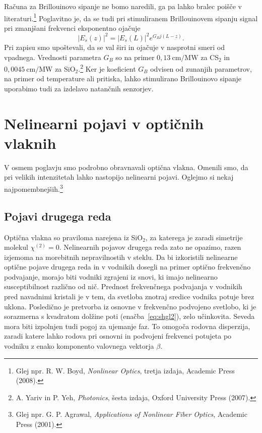 Računa za Brillouinovo sipanje ne bomo naredili, ga pa lahko bralec poišče
v literaturi.\footnote{Glej npr. R. W. Boyd, {\it Nonlinear Optics}, tretja izdaja, Academic Press (2008).}
Poglavitno 
je, da se tudi pri stimuliranem Brillouinovem sipanju signal pri zmanjšani frekvenci
eksponentno ojačuje
\begin{equation}
|E_s(z)|^2 = |E_s(L)|^2 e^{G_Bj(L-z)}.
\end{equation}
Pri zapisu smo upoštevali, da se val širi in ojačuje v nasprotni smeri od vpadnega.
Vrednosti parametra $G_B$ so na primer $0,13~\si{\cm/\mega\watt}$ za CS$_2$ 
in $0,0045~\si{\cm/\mega\watt}$ za SiO$_2$.\footnote{A. Yariv in 
P. Yeh, {\it Photonics}, šesta izdaja, Oxford University Press (2007).}
Ker je koeficient $G_B$ odvisen od zunanjih parametrov, na primer od 
temperature ali pritiska, lahko stimulirano Brillouinovo sipanje uporabimo tudi za
izdelavo natančnih senzorjev. 

\section{Nelinearni pojavi v optičnih vlaknih}
\label{NLOFIB}
V osmem poglavju smo podrobno obravnavali optična vlakna. Omenili smo, da pri 
velikih intenzitetah lahko nastopijo nelinearni pojavi. Oglejmo si nekaj najpomembnejših.\footnote{Glej npr.
G. P. Agrawal, {\it Applications of Nonlinear Fiber Optics}, Academic Press (2001).}

\subsection*{Pojavi drugega reda}
Optična vlakna so praviloma narejena iz SiO$_2$, 
za katerega je zaradi simetrije molekul $\chi^{(2)}=0$. 
Nelinearnih pojavov drugega reda zato ne opazimo, razen izjemoma na morebitnih 
nepravilnostih v steklu.
Da bi izkoristili nelinearne optične pojave
drugega reda in v vodnikih dosegli na primer optično frekvenčno podvajanje,
morajo biti vodniki zgrajeni iz snovi, ki imajo nelinearno susceptibilnost 
različno od nič. Prednost frekvenčnega podvajanja v vodnikih pred navadnimi 
kristali je v tem, 
da svetloba znotraj sredice vodnika potuje brez uklona. Posledično je
pretvorba iz osnovne v frekvenčno podvojeno svetlobo, ki je sorazmerna s kvadratom 
dolžine poti (enačba~\ref{eq:shgl2}), zelo učinkovita. Seveda 
mora biti izpolnjen tudi pogoj za ujemanje faz. To 
omogoča rodovna disperzija, zaradi 
katere lahko rodova pri osnovni in podvojeni frekvenci potujeta po vodniku
z enako komponento valovnega vektorja $\beta$.

